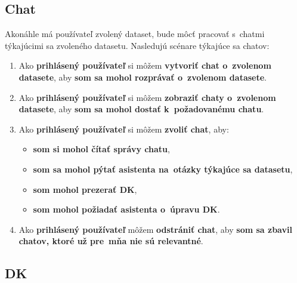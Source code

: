 \subsection{Chat}
\label{chat}

Akonáhle má používateľ zvolený dataset, bude môcť pracovať s~chatmi týkajúcimi sa zvoleného datasetu. Nasledujú scénare týkajúce sa chatov:
\begin{enumerate}
\item Ako \textbf{prihlásený používateľ} si môžem \textbf{vytvoriť chat o~zvolenom datasete}, aby \textbf{som sa mohol rozprávať o~zvolenom datasete}.

\item Ako \textbf{prihlásený používateľ} si môžem \textbf{zobraziť chaty o~zvolenom datasete}, aby \textbf{som sa mohol dostať k~požadovanému chatu}.

\item Ako \textbf{prihlásený používateľ} si môžem \textbf{zvoliť chat}, aby:
\begin{itemize}
\item \textbf{som si mohol čítať správy chatu},
\item \textbf{som sa mohol pýtať asistenta na~otázky týkajúce sa datasetu},
\item \textbf{som mohol prezerať DK},
\item \textbf{som mohol požiadať asistenta o~úpravu DK}.
\end{itemize}

\item Ako \textbf{prihlásený používateľ} môžem \textbf{odstrániť chat}, aby \textbf{som sa zbavil chatov, ktoré už pre~mňa nie sú relevantné}.
\end{enumerate}

\subsection{DK}
\label{dk}

